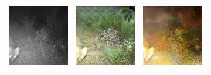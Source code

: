 \documentclass[a4paper,11pt, DIV=12]{scrartcl}
\begin{document}
\begin{figure}[ht]
\begin{subfigure}{0.65\textwidth}
\begin{tabularx}{\textwidth}{>{\centering\arraybackslash}X >{\centering\arraybackslash}X >{\centering\arraybackslash}X}
         \includegraphics{586ae0f6-23d2-11e8-a6a3-ec086b02610b_real.png} & \includegraphics{586ae0f6-23d2-11e8-a6a3-ec086b02610b_hal.png} & \includegraphics{586ae0f6-23d2-11e8-a6a3-ec086b02610b_without_hal.png} \\

\end{tabularx}
\end{subfigure}
\end{figure}
\end{document}
